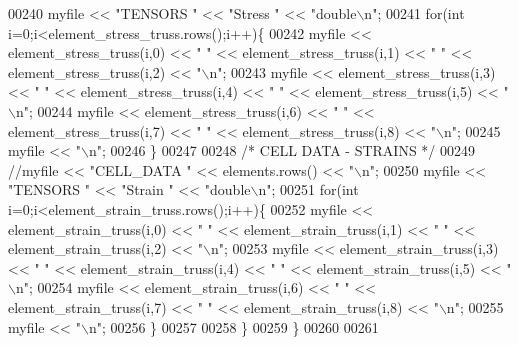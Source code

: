 \begin{DoxyCode}
00240             myfile << \textcolor{stringliteral}{"TENSORS "} << \textcolor{stringliteral}{"Stress "} << \textcolor{stringliteral}{"double\(\backslash\)n"};
00241         \textcolor{keywordflow}{for}(\textcolor{keywordtype}{int} i=0;i<element\_stress\_truss.rows();i++)\{
00242                 myfile << element\_stress\_truss(i,0) << \textcolor{stringliteral}{" "} << element\_stress\_truss(i,1) << \textcolor{stringliteral}{" "} << 
      element\_stress\_truss(i,2) << \textcolor{stringliteral}{"\(\backslash\)n"};
00243                 myfile << element\_stress\_truss(i,3) << \textcolor{stringliteral}{" "} << element\_stress\_truss(i,4) << \textcolor{stringliteral}{" "} << 
      element\_stress\_truss(i,5) << \textcolor{stringliteral}{"\(\backslash\)n"};
00244                 myfile << element\_stress\_truss(i,6) << \textcolor{stringliteral}{" "} << element\_stress\_truss(i,7) << \textcolor{stringliteral}{" "} << 
      element\_stress\_truss(i,8) << \textcolor{stringliteral}{"\(\backslash\)n"};
00245                 myfile << \textcolor{stringliteral}{"\(\backslash\)n"};
00246         \}
00247 
00248         \textcolor{comment}{/* CELL DATA - STRAINS */}
00249         \textcolor{comment}{//myfile << "CELL\_DATA " << elements.rows() << "\(\backslash\)n";}
00250             myfile << \textcolor{stringliteral}{"TENSORS "} << \textcolor{stringliteral}{"Strain "} << \textcolor{stringliteral}{"double\(\backslash\)n"};
00251         \textcolor{keywordflow}{for}(\textcolor{keywordtype}{int} i=0;i<element\_strain\_truss.rows();i++)\{
00252                 myfile << element\_strain\_truss(i,0) << \textcolor{stringliteral}{" "} << element\_strain\_truss(i,1) << \textcolor{stringliteral}{" "} << 
      element\_strain\_truss(i,2) << \textcolor{stringliteral}{"\(\backslash\)n"};
00253                 myfile << element\_strain\_truss(i,3) << \textcolor{stringliteral}{" "} << element\_strain\_truss(i,4) << \textcolor{stringliteral}{" "} << 
      element\_strain\_truss(i,5) << \textcolor{stringliteral}{"\(\backslash\)n"};
00254                 myfile << element\_strain\_truss(i,6) << \textcolor{stringliteral}{" "} << element\_strain\_truss(i,7) << \textcolor{stringliteral}{" "} << 
      element\_strain\_truss(i,8) << \textcolor{stringliteral}{"\(\backslash\)n"};
00255                 myfile << \textcolor{stringliteral}{"\(\backslash\)n"};
00256         \}
00257 
00258     \}
00259 \}
00260 
00261 
\end{DoxyCode}
